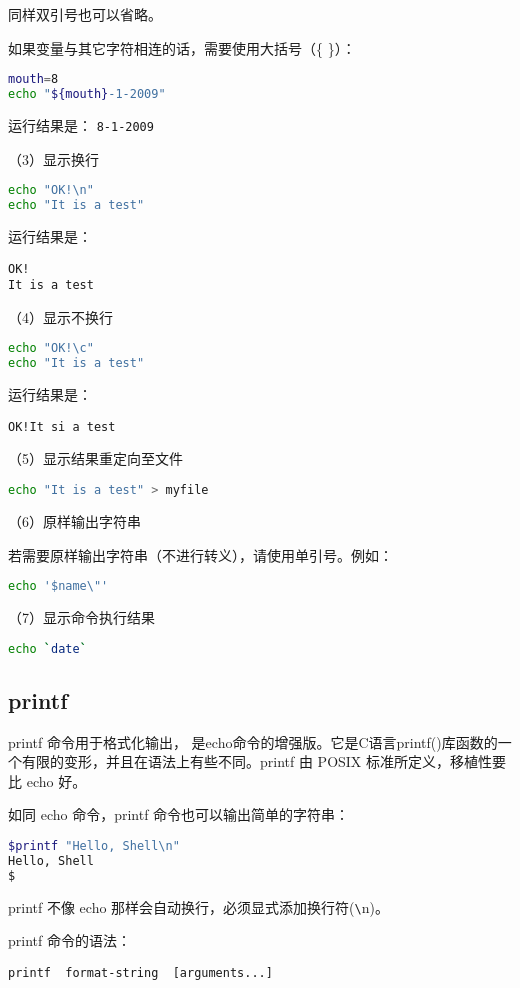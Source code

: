 同样双引号也可以省略。

如果变量与其它字符相连的话，需要使用大括号（\{ \}）：
\begin{lstlisting}[language=sh]
mouth=8
echo "${mouth}-1-2009"
\end{lstlisting}
运行结果是：
\verb|8-1-2009|

（3）显示换行
\begin{lstlisting}[language=sh]
echo "OK!\n"
echo "It is a test"
\end{lstlisting}
运行结果是：
\begin{verbatim}
OK!
It is a test
\end{verbatim}

（4）显示不换行
\begin{lstlisting}[language=sh]
echo "OK!\c"
echo "It is a test"
\end{lstlisting}
运行结果是：
\begin{verbatim}
OK!It si a test
\end{verbatim}

（5）显示结果重定向至文件
\begin{lstlisting}[language=sh]
echo "It is a test" > myfile
\end{lstlisting}

（6）原样输出字符串

若需要原样输出字符串（不进行转义），请使用单引号。例如：
\begin{lstlisting}[language=sh]
echo '$name\"'
\end{lstlisting}

（7）显示命令执行结果
\begin{lstlisting}[language=sh]
echo `date`
\end{lstlisting}


\subsection{printf}
printf 命令用于格式化输出， 是echo命令的增强版。它是C语言printf()库函数的一个有限的变形，并且在语法上有些不同。printf 由 POSIX 标准所定义，移植性要比 echo 好。

如同 echo 命令，printf 命令也可以输出简单的字符串：
\begin{lstlisting}[language=sh]
$printf "Hello, Shell\n"
Hello, Shell
$
\end{lstlisting}
printf 不像 echo 那样会自动换行，必须显式添加换行符(\verb|\|n)。

printf 命令的语法：

\verb|printf  format-string  [arguments...]|

